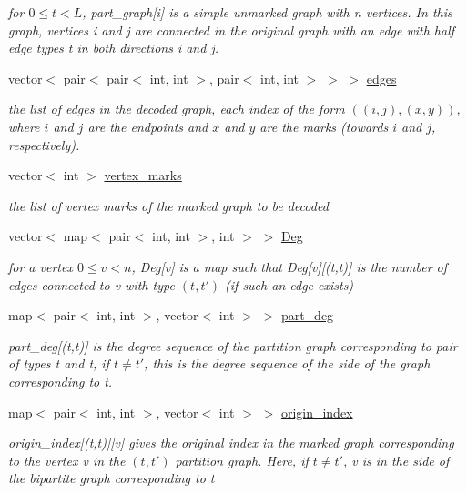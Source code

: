 \begin{DoxyCompactItemize}
\begin{DoxyCompactList}\small\item\em for $0 \leq t < L$, part\+\_\+graph\mbox{[}i\mbox{]} is a simple unmarked graph with n vertices. In this graph, vertices i and j are connected in the original graph with an edge with half edge types t in both directions i and j. \end{DoxyCompactList}\item 
vector$<$ pair$<$ pair$<$ int, int $>$, pair$<$ int, int $>$ $>$ $>$ \hyperlink{classmarked__graph__decoder_af9e75da0a495d9c3bdcd169e15e3261e}{edges}
\begin{DoxyCompactList}\small\item\em the list of edges in the decoded graph, each index of the form $((i,j), (x,y))$, where $i$ and $j$ are the endpoints and $x$ and $y$ are the marks (towards $i$ and $j$, respectively). \end{DoxyCompactList}\item 
vector$<$ int $>$ \hyperlink{classmarked__graph__decoder_a98be932a5abff7efbc8dd4290268b69a}{vertex\+\_\+marks}
\begin{DoxyCompactList}\small\item\em the list of vertex marks of the marked graph to be decoded \end{DoxyCompactList}\item 
vector$<$ map$<$ pair$<$ int, int $>$, int $>$ $>$ \hyperlink{classmarked__graph__decoder_a5040ad86467693eab415f615408bfb9e}{Deg}
\begin{DoxyCompactList}\small\item\em for a vertex $0 \leq v < n$, Deg\mbox{[}v\mbox{]} is a map such that Deg\mbox{[}v\mbox{]}\mbox{[}(t,t\textquotesingle{})\mbox{]} is the number of edges connected to v with type $(t,t')$ (if such an edge exists) \end{DoxyCompactList}\item 
map$<$ pair$<$ int, int $>$, vector$<$ int $>$ $>$ \hyperlink{classmarked__graph__decoder_a6882e96fcad9abb10e72f1398814824a}{part\+\_\+deg}
\begin{DoxyCompactList}\small\item\em part\+\_\+deg\mbox{[}(t,t\textquotesingle{})\mbox{]} is the degree sequence of the partition graph corresponding to pair of types t and t\textquotesingle{}, if $t \neq t'$, this is the degree sequence of the side of the graph corresponding to t. \end{DoxyCompactList}\item 
map$<$ pair$<$ int, int $>$, vector$<$ int $>$ $>$ \hyperlink{classmarked__graph__decoder_aab3e2f6d4376ba96da32f25aa9ddd069}{origin\+\_\+index}
\begin{DoxyCompactList}\small\item\em origin\+\_\+index\mbox{[}(t,t\textquotesingle{})\mbox{]}\mbox{[}v\mbox{]} gives the original index in the marked graph corresponding to the vertex v in the $(t,t')$ partition graph. Here, if $t \neq t'$, v is in the side of the bipartite graph corresponding to t \end{DoxyCompactList}\end{DoxyCompactItemize}


